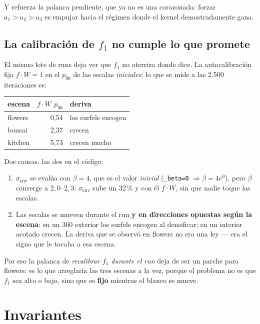 \documentclass[12pt]{extarticle}
\newcommand{\code}[1]{\texttt{#1}}
\begin{document}
Y refuerza la palanca pendiente, que ya no es una corazonada: forzar
$a_1>a_2>a_3$ es empujar hacia el régimen donde el kernel demostradamente gana.

\subsection{La calibración de $f_1$ no cumple lo que promete}

El mismo lote de runs deja ver que $f_1$ no aterriza donde dice. La
autocalibración fija $f\!\cdot\!W=1$ en el $p_{90}$ de las escalas
\emph{iniciales}; lo que se mide a las 2.500 iteraciones es:

\begin{center}\small
\begin{tabular}{@{}lrl@{}}
\toprule
escena & $f\!\cdot\!W$ $p_{90}$ & deriva \\
\midrule
flowers & 0,54 & los surfels encogen \\
bonsai  & 2,37 & crecen \\
kitchen & 5,73 & crecen mucho \\
\bottomrule
\end{tabular}
\end{center}

Dos causas, las dos en el código:

\begin{enumerate}
\item $\sigma_{\text{env}}$ se evalúa con $\beta=4$, que es el valor
      \emph{inicial} (\code{\_beta=0} $\Rightarrow \beta=4e^0$), pero $\beta$
      converge a $2{,}0$--$2{,}3$: $\sigma_{\text{env}}$ sube un 32\,\% y con
      él $f\!\cdot\!W$, sin que nadie toque las escalas.
\item Las escalas se mueven durante el run \textbf{y en direcciones opuestas
      según la escena}: en un 360 exterior los surfels encogen al densificar;
      en un interior acotado crecen. La deriva que se observó en flowers no era
      una ley --- era el signo que le tocaba a esa escena.
\end{enumerate}

Por eso la palanca de \emph{recalibrar $f_1$ durante el run} deja de ser un
parche para flowers: es lo que arreglaría las tres escenas a la vez, porque el
problema no es que $f_1$ sea alto o bajo, sino que es \textbf{fijo} mientras el
blanco se mueve.

\section{Invariantes}
\end{document}
